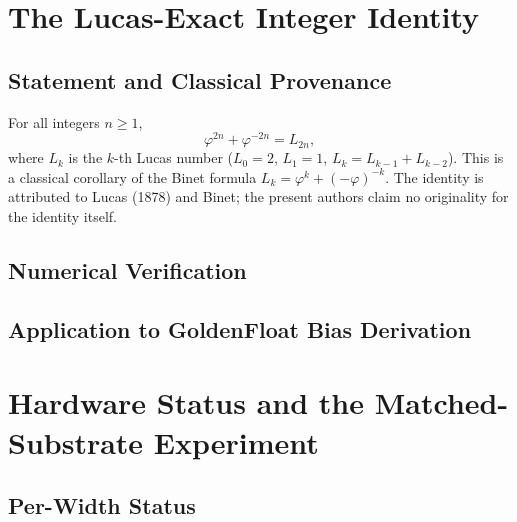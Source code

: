 \documentclass[conference]{IEEEtran}
\begin{document}
\section{The Lucas-Exact Integer Identity}
\label{sec:lucas}


\subsection{Statement and Classical Provenance}
For all integers $n \geq 1$,
\begin{equation}
\label{eq:lucas}
\varphi^{2n} + \varphi^{-2n} = L_{2n},
\end{equation}
where $L_k$ is the $k$-th Lucas number ($L_0 = 2$, $L_1 = 1$, $L_k =
L_{k-1} + L_{k-2}$). This is a classical corollary of the Binet
formula $L_k = \varphi^k + (-\varphi)^{-k}$. The identity is
attributed to Lucas (1878) and Binet; the present authors claim no
originality for the identity itself.

\subsection{Numerical Verification}

\subsection{Application to GoldenFloat Bias Derivation}

\section{Hardware Status and the Matched-Substrate Experiment}
\label{sec:hardware}


\subsection{Per-Width Status}
\end{document}
